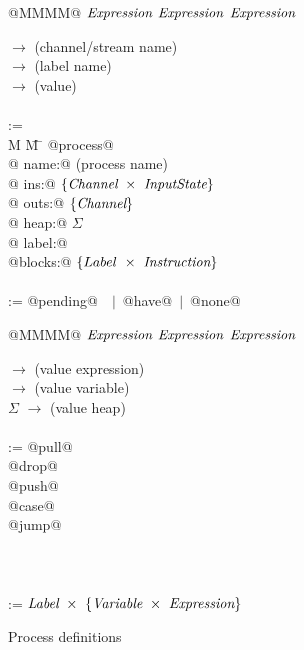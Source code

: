 
\begin{figure}
\begin{minipage}[t]{0.4\textwidth}
\begin{tabbing}
\Instr \TABDEF @MMMM@  \TABSKIP $\textit{Expression}$ \TABSKIP $\textit{Expression}$ \TABSKIP $\textit{Expression}$ \kill

\Chan \> $\to$ \> (channel/stream name) \\
\Label \> $\to$ \> (label name) \\
\Value \> $\to$ \> (value) \\
\\

\Proc \>:=\> \\
M \= M \= \kill
\> @process@ \\
\> \> @  name:@  (process name) \\
\> \> @   ins:@  $\{\textit{Channel} ~\times~ \textit{InputState}\}$ \\
\> \> @  outs:@  $\{ \textit{Channel} \}$ \\
\> \> @  heap:@  $\Sigma$ \\
\> \> @ label:@  \Label \\
\> \> @blocks:@  $\{Label ~\times~ \textit{Instruction}\}$ \\
\\
\Instr \TABDEF \kill
\InputState \> := \> @pending@~\Value~$|$~@have@~$|$~@none@

\end{tabbing}
\end{minipage}
\begin{minipage}[t]{0.05\textwidth}
\quad
\end{minipage}
\begin{minipage}[t]{0.4\textwidth}
\begin{tabbing}
\Instr \TABDEF @MMMM@  \TABSKIP $\textit{Expression}$ \TABSKIP $\textit{Expression}$ \TABSKIP $\textit{Expression}$ \kill

\Exp \> $\to$ \> (value expression) \\
\Var \> $\to$ \> (value variable) \\
$\Sigma$ \> $\to$ \> (value heap) \\
\\

\Instr
    \> :=\> @pull@  \> \Chan  \> \Var  \> \Next \\
    \TABALT @drop@  \> \Chan  \>       \> \Next \\
    \TABALT @push@  \> \Chan  \> \Exp  \> \Next \\
    \TABALT @case@  \> \Exp   \> \Next \> \Next \\
    \TABALT @jump@  \>        \>       \> \Next \\
\\
\\
 \\
\Next \> := \> $\textit{Label}~\times~\{\textit{Variable} ~\times~ \textit{Expression}\}$ \\
\end{tabbing}
\end{minipage}

\caption{Process definitions}
\label{fig:Process:Def}
\end{figure}


